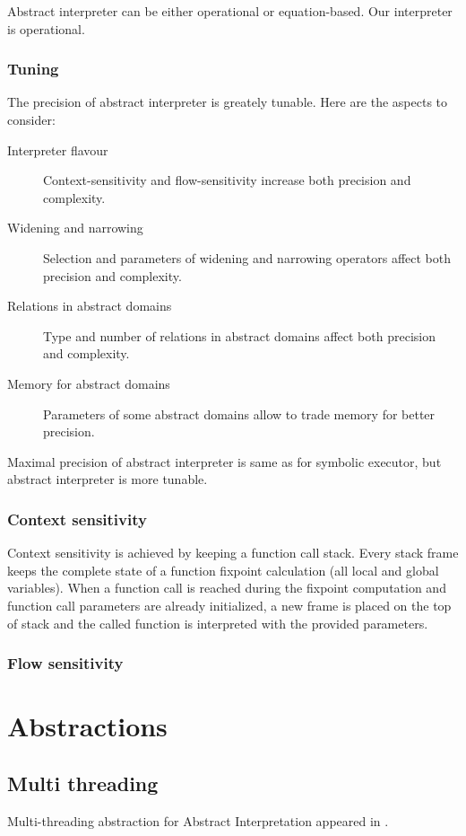 \documentclass[a4paper]{book}
\begin{document}
Abstract interpreter can be either operational or equation-based.  Our
interpreter is operational.

\subsection{Tuning}
The precision of abstract interpreter is greately tunable. Here are
the aspects to consider:
\begin{description}
\item[Interpreter flavour] Context-sensitivity and flow-sensitivity
  increase both precision and complexity.
\item[Widening and narrowing] Selection and parameters of widening and
  narrowing operators affect both precision and complexity.
\item[Relations in abstract domains] Type and number of relations in
  abstract domains affect both precision and complexity.
\item[Memory for abstract domains] Parameters of some abstract domains
  allow to trade memory for better precision.
\end{description}

Maximal precision of abstract interpreter is same as for symbolic
executor, but abstract interpreter is more tunable.

\subsection{Context sensitivity}
Context sensitivity is achieved by keeping a function call stack.
Every stack frame keeps the complete state of a function fixpoint
calculation (all local and global variables).  When a function call is
reached during the fixpoint computation and function call parameters
are already initialized, a new frame is placed on the top of stack and
the called function is interpreted with the provided parameters.

\subsection{Flow sensitivity}


\chapter{Abstractions}

\section{Multi threading}
Multi-threading abstraction for Abstract Interpretation appeared in
\cite{M11}.
\end{document}
